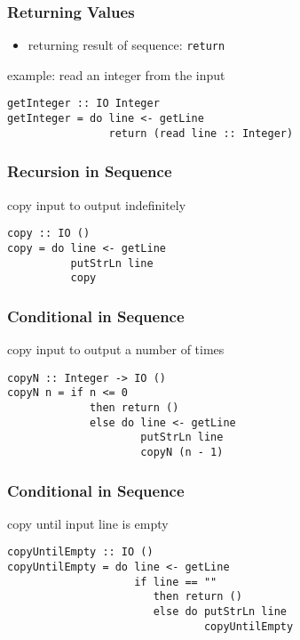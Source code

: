 \documentclass[dvipsnames]{beamer}
\theoremstyle{plain}
\begin{document}
\begin{frame}[fragile]
  \frametitle{Returning Values}

  \begin{itemize}
    \item returning result of sequence: \lstinline|return|
  \end{itemize}

  \begin{exampleblock}{example: read an integer from the input}
    \begin{lstlisting}
getInteger :: IO Integer
getInteger = do line <- getLine
                return (read line :: Integer)
    \end{lstlisting}
  \end{exampleblock}
\end{frame}

\begin{frame}[fragile]
  \frametitle{Recursion in Sequence}

  \begin{exampleblock}{copy input to output indefinitely}
    \begin{lstlisting}
copy :: IO ()
copy = do line <- getLine
          putStrLn line
          copy
    \end{lstlisting}
  \end{exampleblock}
\end{frame}

\begin{frame}[fragile]
  \frametitle{Conditional in Sequence}

  \begin{exampleblock}{copy input to output a number of times}
    \begin{lstlisting}
copyN :: Integer -> IO ()
copyN n = if n <= 0
             then return ()
             else do line <- getLine
                     putStrLn line
                     copyN (n - 1)
    \end{lstlisting}
  \end{exampleblock}
\end{frame}

\begin{frame}[fragile]
  \frametitle{Conditional in Sequence}

  \begin{exampleblock}{copy until input line is empty}
    \begin{lstlisting}
copyUntilEmpty :: IO ()
copyUntilEmpty = do line <- getLine
                    if line == ""
                       then return ()
                       else do putStrLn line
                               copyUntilEmpty
    \end{lstlisting}
  \end{exampleblock}
\end{frame}
\end{document}
